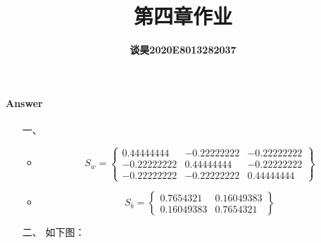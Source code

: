 \documentclass[UTF8,a4paper]{ctexart}
\title{\bfseries 第四章作业 }
\author{\bfseries 谈昊\quad2020E8013282037}
\date{}
\begin{document}
\maketitle


\paragraph{Answer}
\begin{itemize}
    \item[一、] 
    \begin{itemize}
        \item $$S_w=\left\{
            \begin{matrix}
                0.44444444 &-0.22222222 &-0.22222222 \\
                -0.22222222  &0.44444444 &-0.22222222 \\
                -0.22222222 &-0.22222222 & 0.44444444
            \end{matrix}\right\}
            $$
        \item $$S_b=\left\{
            \begin{matrix}
                0.7654321&  0.16049383  \\
                0.16049383& 0.7654321 
            \end{matrix}\right\}
            $$
    \end{itemize}
    
    
    \item[二、] 
    如下图：
        \begin{figure}[H]
            \centering
        \end{figure}
\end{itemize}
\end{document}
